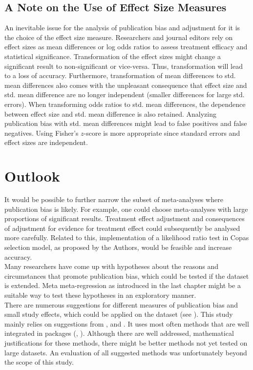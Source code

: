 \documentclass[11pt,a4paper,twoside]{book}\usepackage[]{graphicx}\usepackage[]{color}
\begin{document}
\subsection{A Note on the Use of Effect Size Measures}
An inevitable issue for the analysis of publication bias and adjustment for it is the choice of the effect size measure. Researchers and journal editors rely on effect sizes as mean differences or log odds ratios to assess treatment efficacy and statistical significance. Transformation of the effect sizes might change a significant result to non-significant or vice-versa. Thus, transformation will lead to a loss of accuracy. Furthermore, transformation of mean differences to std. mean differences also comes with the unpleasant consequence that effect size and std. mean difference are no longer independent (smaller differences for large std. errors). When transforming odds ratios to std. mean differences, the dependence between effect size and std. mean difference is also retained. Analyzing publication bias with
std. mean differences might lead to false positives and false negatives. Using Fisher's $z$-score is more appropriate since standard errors and effect sizes are independent.\\



\section{Outlook}
It would be possible to further narrow the subset of meta-analyses where publication bias is likely. For example, one could choose meta-analyses with large proportions of significant results. Treatment effect adjustment and consequences of adjustment for evidence for treatment effect could subsequently be analysed more carefully. Related to this, implementation of a likelihood ratio test in Copas selection model, as proposed by the Authors, would be feasible and increase accuracy. \\
Many researchers have come up with hypotheses about the reasons and circumstances that promote publication bias, which could be tested if the dataset is extended. Meta meta-regression as introduced in the last chapter might be a suitable way to test these hypotheses in an exploratory manner.\\
There are numerous suggestions for different measures of publication bias and small study effects, which could be applied on the dataset (see \citealp{mueller.2016}). This study mainly relies on suggestions from \citet{Sterne}, \citet{Ioannidis2007} and \citet{limitmeta}. It uses most often methods that are well integrated in packages (\citealp{metafor.package}, \citealp{meta.package}). Although there are well addressed, mathematical justifications for these methods, there might be better methods not yet tested on large datasets. An evaluation of all suggested methods was unfortunately beyond the scope of this study.
\end{document}
